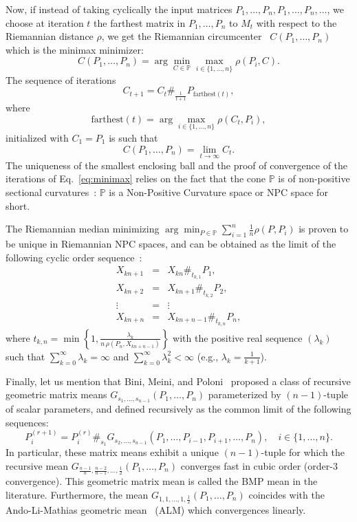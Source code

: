\documentclass{article}
\def\correction#1{{\color{red}{#1}}}
\def\farthest{\mathrm{farthest}}
\def\bbP{\mathbb{P}}
\begin{document}
 
Now, if instead of taking cyclically the input matrices $P_1,\ldots, P_n, P_1,\ldots,P_n,\ldots$, we choose at iteration $t$ the farthest matrix in $P_1,\ldots, P_n$ to $M_t$ with respect to the Riemannian distance $\rho$, we get the Riemannian circumcenter~\cite{arnaudon2013approximating} $C(P_1,\ldots,P_n)$ which is the minimax minimizer: 
$$
C(P_1,\ldots,P_n)=\arg\min_{C\in\bbP} \max_{i\in\{1,\ldots,n\}} \rho(P_i,C).
$$
The sequence of iterations  
\begin{equation}\label{eq:minimax}
C_{t+1}=C_t \#_{\frac{1}{t+1}} P_{\farthest(t)},
\end{equation}
where
$$
\farthest(t)=\arg\max_{i\in\{1,\ldots,n\}} \rho(C_t,P_i),
$$
 initialized with $C_1=P_1$ is such that
$$
C(P_1,\ldots,P_n)=\lim_{t\rightarrow\infty} C_t.
$$
The uniqueness of the smallest enclosing ball and the proof of convergence of the iterations of Eq.~\ref{eq:minimax}  relies on the fact that the cone $\bbP$ is of non-positive sectional curvatures~\cite{arnaudon2013approximating}:
$\bbP$ is a Non-Positive Curvature space or NPC space for short.


The Riemannian median minimizing $\arg\min_{P\in\bbP} \sum_{i=1}^n \frac{1}{n}\rho(P,P_i)$
is proven to be unique in Riemannian NPC spaces, and can be obtained as the limit of the following cyclic order sequence~\cite{bacak2014computing}:
\begin{eqnarray*}
X_{kn+1} &=& X_{kn}\#_{t_{k,1}} P_1,\\
X_{kn+2} &=& X_{kn+1}\#_{t_{k,2}} P_2,\\
\vdots &=& \vdots \\
X_{kn+n} &=& X_{kn+n-1}\#_{t_{k,n}} P_n,
\end{eqnarray*}
where $t_{k,n}=\min\left\{1,\frac{\lambda_k}{n\, \rho(P_n,X_{kn+n-1})}\right\}$ with the positive real sequence $(\lambda_k)$ such that $\sum_{k=0}^\infty \lambda_k=\infty$ and $\sum_{k=0}^\infty \lambda_k^2<\infty$ (e.g., $\lambda_k=\frac{1}{k+1}$).

Finally, let us mention that 
Bini, Meini, and Poloni~\cite{bini2010effective} proposed a class of recursive geometric matrix means 
$G_{s_1,\ldots, s_{n-1}}(P_1,\ldots, P_n)$ parameterized by $(n-1)$-tuple of scalar parameters, and defined recursively as the common limit of the following sequences:
$$
P_i^{(r+1)}= P_i^{(r)}\#_{s_1} G_{s_2,\ldots, s_{n-1}}\left(P_1,\ldots,P_{i-1},P_{i+1},\ldots,P_n\right),\quad i\in\{1,\ldots, n\}.
$$
In particular, these matrix means exhibit a unique $(n-1)$-tuple for which the recursive mean 
$G_{\frac{n-1}{n},\frac{n-2}{n-1},\ldots,\frac{1}{2}}(P_1,\ldots, P_n)$ converges fast in cubic order (order-$3$ convergence). 
This geometric matrix mean is called the BMP mean in the literature. 
Furthermore, the mean $G_{1,1,\ldots,1,\frac{1}{2}}(P_1,\ldots, P_n)$ coincides \correction{\st{in the limit}} with the Ando-Li-Mathias geometric mean~\cite{ALM-2004} (ALM) which convergences linearly.
\end{document}
